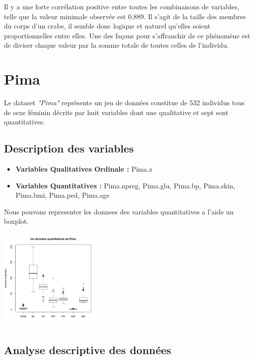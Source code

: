 \documentclass[10pt]{article}
\begin{document}
Il y a une forte corrélation positive entre toutes les combinaisons de variables, telle que la valeur minimale observée est 0.889. 
Il s'agit de la taille des membres du corps d'un crabe, il semble donc logique et naturel qu'elles soient proportionnelles entre elles.
Une des façons pour s'affranchir de ce phénomène est de diviser chaque valeur par la somme totale de toutes celles de l'individu.


\section{Pima}
Le dataset \textit{"Pima"} représente un jeu de données constitue de 532 individus tous de sexe féminin décrits par huit variables dont une qualitative et sept sont quantitatives.

\subsection{Description des variables}


\begin{itemize}
	\item \textbf{Variables Qualitatives Ordinale :}  Pima.z
	\item \textbf{Variables Quantitatives : } Pima.npreg, Pima.glu, Pima.bp, Pima.skin, Pima.bmi, Pima.ped, Pima.age
\end{itemize}

Nous pouvons representer les donnees des variables quantitatives a l'aide un boxplot.
\begin{center}
	\includegraphics[width=50mm]{Figures/Pima/bxp_Pimaquant.png}
	\label{fig:boxplot_pima_quantitatives}
\end{center}

\subsection{Analyse descriptive des données}
\end{document}
